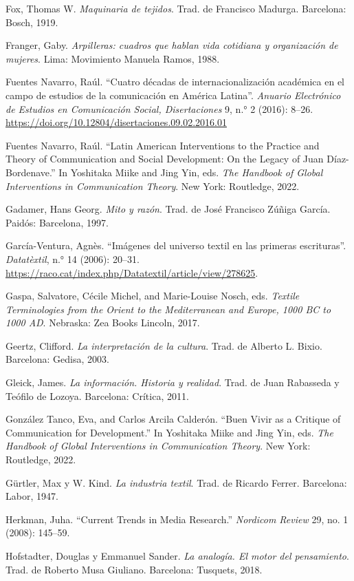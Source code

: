 \documentclass{tufte-handout}
\begin{document}
\begin{hangparas}{.25in}{1}
Fox, Thomas W. \emph{Maquinaria de tejidos}. Trad. de Francisco Madurga.
Barcelona: Bosch, 1919.

Franger, Gaby. \emph{Arpilleras: cuadros que hablan vida cotidiana y
organización de mujeres}. Lima: Movimiento Manuela Ramos, 1988.

Fuentes Navarro, Raúl. ``Cuatro décadas de internacionalización
académica en el campo de estudios de la comunicación en América
Latina''. \emph{Anuario Electrónico de Estudios en Comunicación Social,
Disertaciones} 9, n.° 2 (2016): 8--26.
\url{https://doi.org/10.12804/disertaciones.09.02.2016.01}

Fuentes Navarro, Raúl. ``Latin American Interventions to the Practice
and Theory of Communication and Social Development: On the Legacy of
Juan Díaz-Bordenave.'' In Yoshitaka Miike and Jing Yin, eds. \emph{The
Handbook of Global Interventions in Communication Theory}. New York:
Routledge, 2022.

Gadamer, Hans Georg. \emph{Mito y razón}. Trad. de José Francisco Zúñiga
García. Paidós: Barcelona, 1997.

García-Ventura, Agnès. ``Imágenes del universo textil en las primeras
escrituras''. \emph{Datatèxtil}, n.° 14 (2006): 20--31.
\url{https://raco.cat/index.php/Datatextil/article/view/278625}.

Gaspa, Salvatore, Cécile Michel, and Marie-Louise Nosch, eds.
\emph{Textile Terminologies from the Orient to the Mediterranean and
Europe, 1000 BC to 1000 AD}. Nebraska: Zea Books Lincoln, 2017.

Geertz, Clifford. \emph{La interpretación de la cultura}. Trad. de
Alberto L. Bixio. Barcelona: Gedisa, 2003.

Gleick, James. \emph{La información. Historia y realidad}. Trad. de Juan
Rabasseda y Teófilo de Lozoya. Barcelona: Crítica, 2011.

González Tanco, Eva, and Carlos Arcila Calderón. ``Buen Vivir as a
Critique of Communication for Development.'' In Yoshitaka Miike and Jing
Yin, eds. \emph{The Handbook of Global Interventions in Communication
Theory}. New York: Routledge, 2022.

Gürtler, Max y W. Kind. \emph{La industria textil}. Trad. de Ricardo
Ferrer. Barcelona: Labor, 1947.

Herkman, Juha. ``Current Trends in Media Research.'' \emph{Nordicom
Review} 29, no. 1 (2008): 145--59.

Hofstadter, Douglas y Emmanuel Sander. \emph{La analogía. El motor del
pensamiento}. Trad. de Roberto Musa Giuliano. Barcelona: Tusquets, 2018.


\end{hangparas}
\end{document}
